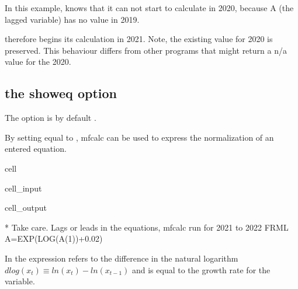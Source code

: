 \documentclass[letterpaper,10pt,english]{jupyterBook}
\begin{document}
\sphinxAtStartPar
In this example, knows that it can not start to calculate in 2020, because A (the lagged variable) has no value in 2019.

\sphinxAtStartPar
{} therefore begins its calculation in 2021. Note, the existing value for 2020 is preserved.  This behaviour differs from other programs that might return a n/a value for the 2020.


\subsection{ \sphinxhyphen{} the showeq option}
\label{\detokenize{content/04_PythonEssentials/mfcalc:mfcalc-the-showeq-option}}
\sphinxAtStartPar
The  option is by default .

\sphinxAtStartPar
By setting equal to , mfcalc can be used to express the normalization of an entered equation.

\begin{sphinxuseclass}{cell}\begin{sphinxVerbatimInput}

\begin{sphinxuseclass}{cell_input}
\begin{sphinxVerbatim}[commandchars=\\\{\}]
\end{sphinxVerbatim}

\end{sphinxuseclass}\end{sphinxVerbatimInput}
\begin{sphinxVerbatimOutput}

\begin{sphinxuseclass}{cell_output}
\begin{sphinxVerbatim}[commandchars=\\\{\}]
* Take care. Lags or leads in the equations, mfcalc run for 2021 to 2022
FRML \PYGZlt{}\PYGZgt{} A=EXP(LOG(A(\PYGZhy{}1))+0.02)\PYGZdl{}
\end{sphinxVerbatim}

\end{sphinxuseclass}\end{sphinxVerbatimOutput}

\end{sphinxuseclass}
\sphinxAtStartPar
In  the expression  refers to the difference in the natural logarithm \(dlog(x_t) \equiv ln(x_t)-ln(x_{t-1})\) and is equal to the growth rate for the variable.
\end{document}
